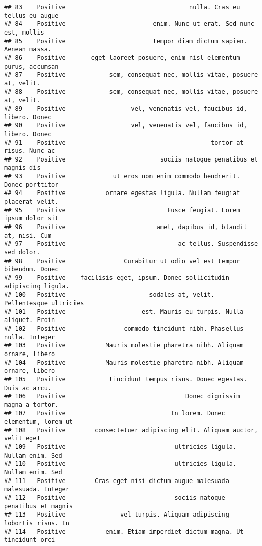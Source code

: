 \documentclass[
]{article}
\begin{document}
\begin{verbatim}
## 83    Positive                                  nulla. Cras eu tellus eu augue
## 84    Positive                        enim. Nunc ut erat. Sed nunc est, mollis
## 85    Positive                        tempor diam dictum sapien. Aenean massa.
## 86    Positive       eget laoreet posuere, enim nisl elementum purus, accumsan
## 87    Positive            sem, consequat nec, mollis vitae, posuere at, velit.
## 88    Positive            sem, consequat nec, mollis vitae, posuere at, velit.
## 89    Positive                  vel, venenatis vel, faucibus id, libero. Donec
## 90    Positive                  vel, venenatis vel, faucibus id, libero. Donec
## 91    Positive                                        tortor at risus. Nunc ac
## 92    Positive                          sociis natoque penatibus et magnis dis
## 93    Positive             ut eros non enim commodo hendrerit. Donec porttitor
## 94    Positive           ornare egestas ligula. Nullam feugiat placerat velit.
## 95    Positive                            Fusce feugiat. Lorem ipsum dolor sit
## 96    Positive                         amet, dapibus id, blandit at, nisi. Cum
## 97    Positive                               ac tellus. Suspendisse sed dolor.
## 98    Positive                Curabitur ut odio vel est tempor bibendum. Donec
## 99    Positive    facilisis eget, ipsum. Donec sollicitudin adipiscing ligula.
## 100   Positive                       sodales at, velit. Pellentesque ultricies
## 101   Positive                     est. Mauris eu turpis. Nulla aliquet. Proin
## 102   Positive                commodo tincidunt nibh. Phasellus nulla. Integer
## 103   Positive           Mauris molestie pharetra nibh. Aliquam ornare, libero
## 104   Positive           Mauris molestie pharetra nibh. Aliquam ornare, libero
## 105   Positive            tincidunt tempus risus. Donec egestas. Duis ac arcu.
## 106   Positive                                 Donec dignissim magna a tortor.
## 107   Positive                             In lorem. Donec elementum, lorem ut
## 108   Positive        consectetuer adipiscing elit. Aliquam auctor, velit eget
## 109   Positive                              ultricies ligula. Nullam enim. Sed
## 110   Positive                              ultricies ligula. Nullam enim. Sed
## 111   Positive        Cras eget nisi dictum augue malesuada malesuada. Integer
## 112   Positive                              sociis natoque penatibus et magnis
## 113   Positive               vel turpis. Aliquam adipiscing lobortis risus. In
## 114   Positive           enim. Etiam imperdiet dictum magna. Ut tincidunt orci

\end{verbatim}
\end{document}
